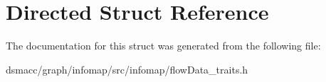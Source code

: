 \hypertarget{structDirected}{}\section{Directed Struct Reference}
\label{structDirected}


The documentation for this struct was generated from the following file\+:\begin{DoxyCompactItemize}
\item 
dsmacc/graph/infomap/src/infomap/flow\+Data\+\_\+traits.\+h\end{DoxyCompactItemize}
